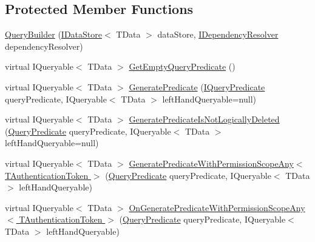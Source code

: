 \subsection*{Protected Member Functions}
\begin{DoxyCompactItemize}
\item 
\hyperlink{classCqrs_1_1Repositories_1_1Queries_1_1QueryBuilder_a8a7b6495f78adedc7b7a82d2c83f17d5_a8a7b6495f78adedc7b7a82d2c83f17d5}{Query\+Builder} (\hyperlink{interfaceCqrs_1_1DataStores_1_1IDataStore}{I\+Data\+Store}$<$ T\+Data $>$ data\+Store, \hyperlink{interfaceCqrs_1_1Configuration_1_1IDependencyResolver}{I\+Dependency\+Resolver} dependency\+Resolver)
\item 
virtual I\+Queryable$<$ T\+Data $>$ \hyperlink{classCqrs_1_1Repositories_1_1Queries_1_1QueryBuilder_a7dc8f0da3bb4ef54b8cbdda6c50ee0a1_a7dc8f0da3bb4ef54b8cbdda6c50ee0a1}{Get\+Empty\+Query\+Predicate} ()
\item 
virtual I\+Queryable$<$ T\+Data $>$ \hyperlink{classCqrs_1_1Repositories_1_1Queries_1_1QueryBuilder_a553ad69e77d37f28b40e6c9d8e98b716_a553ad69e77d37f28b40e6c9d8e98b716}{Generate\+Predicate} (\hyperlink{interfaceCqrs_1_1Repositories_1_1Queries_1_1IQueryPredicate}{I\+Query\+Predicate} query\+Predicate, I\+Queryable$<$ T\+Data $>$ left\+Hand\+Queryable=null)
\item 
virtual I\+Queryable$<$ T\+Data $>$ \hyperlink{classCqrs_1_1Repositories_1_1Queries_1_1QueryBuilder_a6095cfcbd824578e7c70e2028e1ac6ad_a6095cfcbd824578e7c70e2028e1ac6ad}{Generate\+Predicate\+Is\+Not\+Logically\+Deleted} (\hyperlink{classCqrs_1_1Repositories_1_1Queries_1_1QueryPredicate}{Query\+Predicate} query\+Predicate, I\+Queryable$<$ T\+Data $>$ left\+Hand\+Queryable=null)
\item 
virtual I\+Queryable$<$ T\+Data $>$ \hyperlink{classCqrs_1_1Repositories_1_1Queries_1_1QueryBuilder_a7768a63fd46f991f87a00b51484c2f34_a7768a63fd46f991f87a00b51484c2f34}{Generate\+Predicate\+With\+Permission\+Scope\+Any$<$ T\+Authentication\+Token $>$} (\hyperlink{classCqrs_1_1Repositories_1_1Queries_1_1QueryPredicate}{Query\+Predicate} query\+Predicate, I\+Queryable$<$ T\+Data $>$ left\+Hand\+Queryable)
\item 
virtual I\+Queryable$<$ T\+Data $>$ \hyperlink{classCqrs_1_1Repositories_1_1Queries_1_1QueryBuilder_aee213115d002518b78463c7bc5fb5c52_aee213115d002518b78463c7bc5fb5c52}{On\+Generate\+Predicate\+With\+Permission\+Scope\+Any$<$ T\+Authentication\+Token $>$} (\hyperlink{classCqrs_1_1Repositories_1_1Queries_1_1QueryPredicate}{Query\+Predicate} query\+Predicate, I\+Queryable$<$ T\+Data $>$ left\+Hand\+Queryable)

\end{DoxyCompactItemize}
